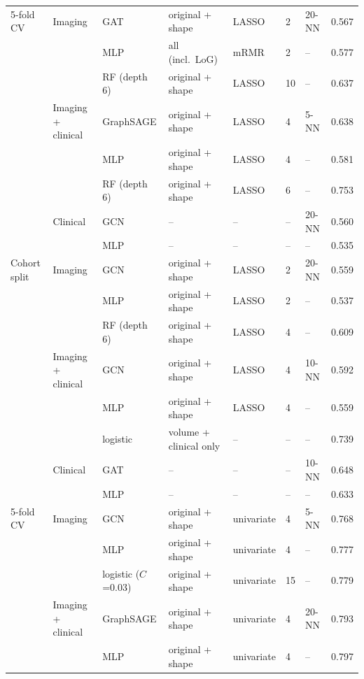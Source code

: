 \begin{tabularx}{\linewidth}{Q{2.0cm} Q{2.6cm} Q{2.6cm} J Q{1.7cm} P{0.6cm} P{1.2cm} P{1.4cm}}
\toprule
{} &  &  &  &  &  &  &  \\
\midrule
{}
5-fold CV & Imaging & GAT & original + shape & LASSO & 2 & 20-NN & 0.567 \\
 &  & MLP & all (incl.\ LoG) & mRMR & 2 & -- & 0.577 \\
 & & RF (depth 6) & original + shape & LASSO & 10 & -- & 0.637 \\
 & Imaging + clinical & GraphSAGE & original + shape & LASSO & 4 & 5-NN & 0.638 \\
 &  & MLP & original + shape & LASSO & 4 & -- & 0.581 \\
 & & RF (depth 6) & original + shape & LASSO & 6 & -- & 0.753 \\
 & Clinical & GCN & -- & -- & -- & 20-NN & 0.560 \\
 &  & MLP & -- & -- & -- & -- & 0.535 \\
Cohort split & Imaging & GCN & original + shape & LASSO & 2 & 20-NN & 0.559 \\
 &  & MLP & original + shape & LASSO & 2 & -- & 0.537 \\
 & & RF (depth 6) & original + shape & LASSO & 4 & -- & 0.609 \\
 & Imaging + clinical & GCN & original + shape & LASSO & 4 & 10-NN & 0.592 \\
 &  & MLP & original + shape & LASSO & 4 & -- & 0.559 \\
 & & logistic & volume + clinical only & -- & -- & -- & 0.739 \\
 & Clinical & GAT & -- & -- & -- & 10-NN & 0.648 \\
 &  & MLP & -- & -- & -- & -- & 0.633 \\
5-fold CV & Imaging & GCN & original + shape & univariate & 4 & 5-NN & 0.768 \\
 &  & MLP & original + shape & univariate & 4 & -- & 0.777 \\
 & & logistic ($C$=0.03) & original + shape & univariate & 15 & -- & 0.779 \\
 & Imaging + clinical & GraphSAGE & original + shape & univariate & 4 & 20-NN & 0.793 \\
 &  & MLP & original + shape & univariate & 4 & -- & 0.797 \\

\end{tabularx}
